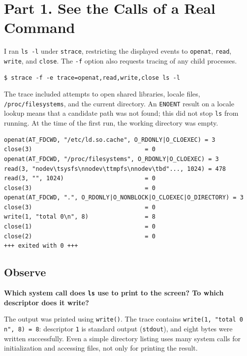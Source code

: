\documentclass[12pt,a4paper]{article}
\begin{document}
\section{Part 1. See the Calls of a Real Command}
I ran \texttt{ls -l} under \texttt{strace}, restricting the displayed events to \texttt{openat}, \texttt{read}, \texttt{write}, and \texttt{close}. The \texttt{-f} option also requests tracing of any child processes.

\begin{lstlisting}[caption={Command used to inspect the system calls of ls}]
$ strace -f -e trace=openat,read,write,close ls -l
\end{lstlisting}

The trace included attempts to open shared libraries, locale files, \texttt{/proc/filesystems}, and the current directory. An \texttt{ENOENT} result on a locale lookup means that a candidate path was not found; this did not stop \texttt{ls} from running. At the time of the first run, the working directory was empty.

\begin{lstlisting}[caption={Selected lines from the real ls trace}]
openat(AT_FDCWD, "/etc/ld.so.cache", O_RDONLY|O_CLOEXEC) = 3
close(3)                                = 0
openat(AT_FDCWD, "/proc/filesystems", O_RDONLY|O_CLOEXEC) = 3
read(3, "nodev\tsysfs\nnodev\ttmpfs\nnodev\tbd"..., 1024) = 478
read(3, "", 1024)                       = 0
close(3)                                = 0
openat(AT_FDCWD, ".", O_RDONLY|O_NONBLOCK|O_CLOEXEC|O_DIRECTORY) = 3
close(3)                                = 0
write(1, "total 0\n", 8)                = 8
close(1)                                = 0
close(2)                                = 0
+++ exited with 0 +++
\end{lstlisting}

\subsection{Observe}
\textbf{Which system call does \texttt{ls} use to print to the screen? To which descriptor does it write?}

The output was printed using \texttt{write()}. The trace contains \texttt{write(1, "total 0\\n", 8) = 8}: descriptor \texttt{1} is standard output (\texttt{stdout}), and eight bytes were written successfully. Even a simple directory listing uses many system calls for initialization and accessing files, not only for printing the result.
\end{document}
